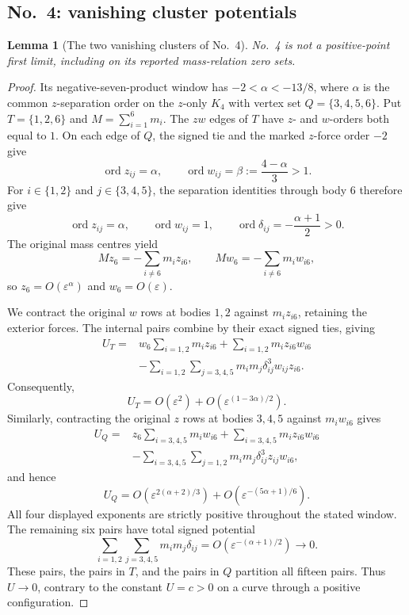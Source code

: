 \documentclass[11pt]{amsart}
\newtheorem{lemma}[theorem]{Lemma}
\theoremstyle{remark}
\newcommand{\ord}{\operatorname{ord}}
\begin{document}
\subsection{No.~4: vanishing cluster potentials}
\begin{lemma}[The two vanishing clusters of No.~4]\label{lem:reported-no4}
No.~4 is not a positive-point first limit, including on its reported mass-relation zero sets.
\end{lemma}
\begin{proof}
Its negative-seven-product window has $-2<\alpha<-13/8$, where $\alpha$ is the common $z$-separation order on the $z$-only $K_4$ with vertex set $Q=\{3,4,5,6\}$. Put $T=\{1,2,6\}$ and $M=\sum_{i=1}^6m_i$. The $zw$ edges of $T$ have $z$- and $w$-orders both equal to $1$. On each edge of $Q$, the signed tie and the marked $z$-force order $-2$ give
\[
 \ord z_{ij}=\alpha,\qquad
 \ord w_{ij}=\beta:=\frac{4-\alpha}{3}>1.
\]
For $i\in\{1,2\}$ and $j\in\{3,4,5\}$, the separation identities through body $6$ therefore give
\[
 \ord z_{ij}=\alpha,\qquad \ord w_{ij}=1,\qquad
 \ord\delta_{ij}=-\frac{\alpha+1}{2}>0.
\]
The original mass centres yield
\[
 Mz_6=-\sum_{i\ne6}m_i z_{i6},\qquad
 Mw_6=-\sum_{i\ne6}m_i w_{i6},
\]
so $z_6=O(\varepsilon^\alpha)$ and $w_6=O(\varepsilon)$.

We contract the original $w$ rows at bodies $1,2$ against $m_i z_{i6}$, retaining the exterior forces. The internal pairs combine by their exact signed ties, giving
\[
\begin{aligned}
 U_T={}&w_6\sum_{i=1,2}m_i z_{i6}
       +\sum_{i=1,2}m_i z_{i6}w_{i6}\\
 &-\sum_{i=1,2}\sum_{j=3,4,5}
       m_im_j\delta_{ij}^3w_{ij}z_{i6}.
\end{aligned}
\]
Consequently,
\[
 U_T=O(\varepsilon^2)
       +O\!\left(\varepsilon^{(1-3\alpha)/2}\right).
\]
Similarly, contracting the original $z$ rows at bodies $3,4,5$ against $m_iw_{i6}$ gives
\[
\begin{aligned}
 U_Q={}&z_6\sum_{i=3,4,5}m_iw_{i6}
       +\sum_{i=3,4,5}m_i z_{i6}w_{i6}\\
 &-\sum_{i=3,4,5}\sum_{j=1,2}
       m_im_j\delta_{ij}^3z_{ij}w_{i6},
\end{aligned}
\]
and hence
\begin{equation}\label{eq:no4-relative-orders}
 U_Q=O\!\left(\varepsilon^{2(\alpha+2)/3}\right)
       +O\!\left(\varepsilon^{-(5\alpha+1)/6}\right).
\end{equation}
All four displayed exponents are strictly positive throughout the stated window. The remaining six pairs have total signed potential
\[
 \sum_{i=1,2}\sum_{j=3,4,5}m_im_j\delta_{ij}
 =O\!\left(\varepsilon^{-(\alpha+1)/2}\right)\longrightarrow0.
\]
These pairs, the pairs in $T$, and the pairs in $Q$ partition all fifteen pairs. Thus $U\to0$, contrary to the constant $U=c>0$ on a curve through a positive configuration.
\end{proof}
\end{document}
